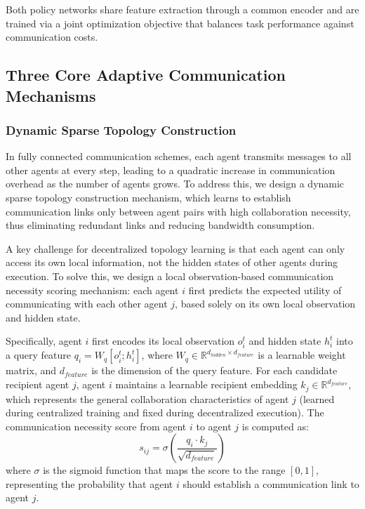 \documentclass[10pt, twocolumn]{IEEEtran}
\begin{document}
Both policy networks share feature extraction through a common encoder and are trained via a joint optimization objective that balances task performance against communication costs.

\subsection{Three Core Adaptive Communication Mechanisms}
\subsubsection{Dynamic Sparse Topology Construction}
In fully connected communication schemes, each agent transmits messages to all other agents at every step, leading to a quadratic increase in communication overhead as the number of agents grows. To address this, we design a dynamic sparse topology construction mechanism, which learns to establish communication links only between agent pairs with high collaboration necessity, thus eliminating redundant links and reducing bandwidth consumption.

A key challenge for decentralized topology learning is that each agent can only access its own local information, not the hidden states of other agents during execution. To solve this, we design a local observation-based communication necessity scoring mechanism: each agent $i$ first predicts the expected utility of communicating with each other agent $j$, based solely on its own local observation and hidden state.

Specifically, agent $i$ first encodes its local observation $o_i^t$ and hidden state $h_i^t$ into a query feature $q_i = W_q [o_i^t; h_i^t]$, where $W_q \in \mathbb{R}^{d_{hidden} \times d_{feature}}$ is a learnable weight matrix, and $d_{feature}$ is the dimension of the query feature. For each candidate recipient agent $j$, agent $i$ maintains a learnable recipient embedding $k_j \in \mathbb{R}^{d_{feature}}$, which represents the general collaboration characteristics of agent $j$ (learned during centralized training and fixed during decentralized execution). The communication necessity score from agent $i$ to agent $j$ is computed as:
\begin{equation}
s_{ij} = \sigma\left( \frac{q_i \cdot k_j}{\sqrt{d_{feature}}} \right)
\end{equation}
where $\sigma$ is the sigmoid function that maps the score to the range $[0, 1]$, representing the probability that agent $i$ should establish a communication link to agent $j$.
\end{document}

